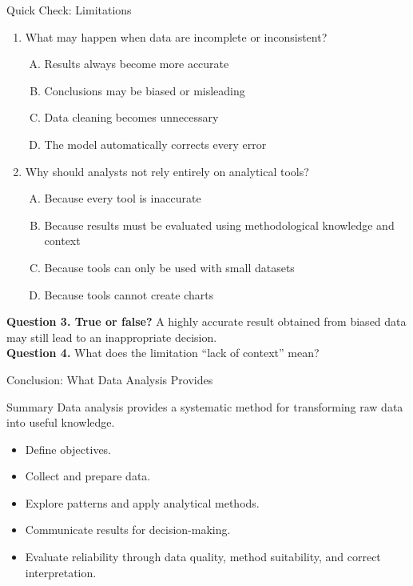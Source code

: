 \documentclass[aspectratio=169,11pt]{beamer}
\newcommand{\quiztitle}[1]{\textbf{\textcolor{QuizOrange}{#1}}}
\begin{document}
\begin{frame}{Quick Check: Limitations}
\begin{enumerate}
  \item What may happen when data are incomplete or inconsistent?
  \begin{enumerate}[A.]
    \item Results always become more accurate
    \item Conclusions may be biased or misleading
    \item Data cleaning becomes unnecessary
    \item The model automatically corrects every error
  \end{enumerate}
  \item Why should analysts not rely entirely on analytical tools?
  \begin{enumerate}[A.]
    \item Because every tool is inaccurate
    \item Because results must be evaluated using methodological knowledge and context
    \item Because tools can only be used with small datasets
    \item Because tools cannot create charts
  \end{enumerate}
\end{enumerate}
\quiztitle{Question 3. True or false?} A highly accurate result obtained from biased data may still lead to an inappropriate decision.\\[0.3em]
\quiztitle{Question 4.} What does the limitation ``lack of context'' mean?
\end{frame}

\begin{frame}{Conclusion: What Data Analysis Provides}
\begin{block}{Summary}
Data analysis provides a systematic method for transforming raw data into useful knowledge.
\end{block}
\begin{itemize}
  \item Define objectives.
  \item Collect and prepare data.
  \item Explore patterns and apply analytical methods.
  \item Communicate results for decision-making.
  \item Evaluate reliability through data quality, method suitability, and correct interpretation.
\end{itemize}
\end{frame}
\end{document}
